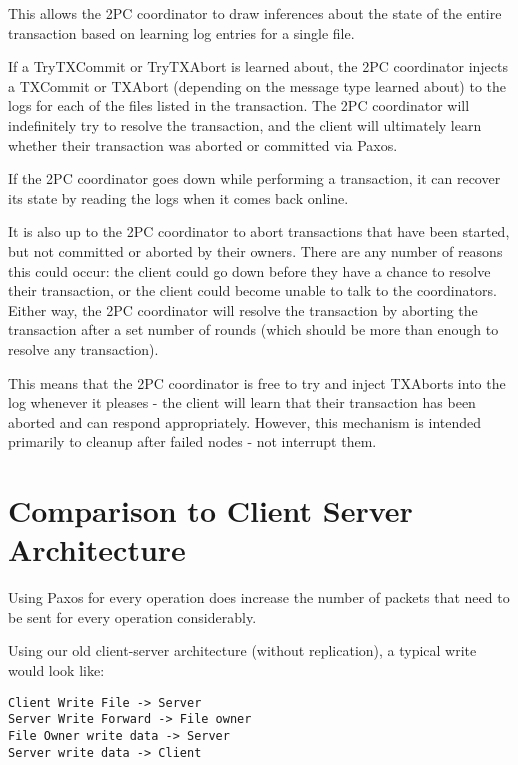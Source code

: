 \documentclass[11pt]{article}
\begin{document}
This allows the 2PC coordinator to draw inferences about the state of the entire transaction based on learning log entries for a single file.

If a TryTXCommit or TryTXAbort is learned about, the 2PC coordinator injects a TXCommit or TXAbort (depending on the message type learned about) to the logs for each of the files listed in the transaction.
The 2PC coordinator will indefinitely try to resolve the transaction, and the client will ultimately learn whether their transaction was aborted or committed via Paxos. 

If the 2PC coordinator goes down while performing a transaction, it can recover its state by reading the logs when it comes back online.

It is also up to the 2PC coordinator to abort transactions that have been started, but not committed or aborted by their owners. There are any number of reasons this could occur: the client could go down before they have a chance to resolve their transaction, or the client could become unable to talk to the coordinators. Either way, the 2PC coordinator will resolve the transaction by aborting the transaction after a set number of rounds (which should be more than enough to resolve any transaction).

This means that the 2PC coordinator is free to try and inject TXAborts into the log whenever it pleases - the client will learn that their transaction has been aborted and can respond appropriately. However, this mechanism is intended primarily to cleanup after failed nodes - not interrupt them.

\section{Comparison to Client Server Architecture}




Using Paxos for every operation does increase the number of packets that need to be sent for every operation considerably.

Using our old client-server architecture (without replication), a typical write would look like:

\begin{verbatim}
Client Write File -> Server
Server Write Forward -> File owner
File Owner write data -> Server
Server write data -> Client
\end{verbatim}
\end{document}
